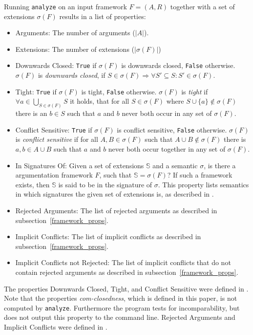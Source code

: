 \documentclass[parskip=half]{scrartcl}
\begin{document}
Running \texttt{analyze} on an input framework $F=(A,R)$ together with a set of
extensions $\sigma(F)$ results in a list of properties:
\begin{itemize}
  \item Arguments: The number of arguments ($|A|$).
  \item Extensions:	The number of extensions ($|\sigma(F)|$)
  \item Downwards Closed:	\texttt{True} if $\sigma(F)$ is downwards closed,
      \texttt{False} otherwise.  $\sigma(F)$ is \emph{downwards closed}, if $S
      \in \sigma(F)\Rightarrow \forall S'\subseteq S: S'\in\sigma(F)$.
  \item Tight: \texttt{True} if $\sigma(F)$ is tight, \texttt{False}
      otherwise.  $\sigma(F)$ is \emph{tight} if $\forall
      a\in\bigcup_{S\in\sigma(F)}S$ it holds, that for all $S\in\sigma(F)$ where
      $S\cup\{a\}\notin\sigma(F)$ there is an $b\in S$ such that $a$ and $b$
      never both occur in any set of $\sigma(F)$.
  \item Conflict Sensitive: \texttt{True} if $\sigma(F)$ is conflict sensitive,
      \texttt{False} otherwise.  $\sigma(F)$ is \emph{conflict sensitive} if for
      all $A, B\in\sigma(F)$ such that $A\cup B\notin\sigma(F)$ there is $a,
      b\in A\cup B$ such that $a$ and $b$ never both occur together in any set of
      $\sigma(F)$.
  \item In Signatures Of: Given a set of extensions $\mathbb{S}$ and a semantic
      $\sigma$, is there a argumentation framework $F$, such that $\mathbb{S} =
      \sigma(F)$? If such a framework exists, then $\mathbb{S}$ is said to be in
      the signature of $\sigma$. This property lists semantics in which
      signatures the given set of extensions is, as described in
      \cite{dunne2015characteristics}.
  \item Rejected Arguments: The list of rejected arguments as described in
      subsection~\ref{framework_props}.
  \item Implicit Conflicts: The list of implicit conflicts as described in
      subsection~\ref{framework_props}.
  \item Implicit Conflicts not Rejected: The list of implicit conflicts that do
      not contain rejected arguments as described in
      subsection~\ref{framework_props}.
\end{itemize}

The properties Downwards Closed, Tight, and Conflict Sensitive were
defined in \cite{dunne2015characteristics}. Note that the properties
\emph{com-closedness}, which is defined in this paper, is not
computed by \texttt{analyze}. Furthermore the program tests for
incomparability, but does not output this property to the command line.
Rejected Arguments and Implicit Conflicts were defined in
\cite{linsbichler2015hidden}.
\end{document}
